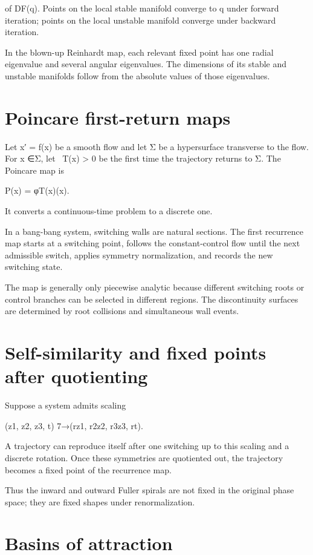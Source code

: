 of DF(q). Points on the local stable manifold converge to q under forward iteration; points on the local unstable manifold converge under backward iteration.


In the blown-up Reinhardt map, each relevant fixed point has one radial eigenvalue and several angular eigenvalues. The dimensions of its stable and unstable manifolds follow from the absolute values of those eigenvalues.


\section{Poincare first-return maps}

\begin{displaytext}
Let x′ = f(x) be a smooth flow and let Σ be a hypersurface transverse to the flow. For x ∈Σ, let \
T(x) > 0 be the first time the trajectory returns to Σ. The Poincare map is
\end{displaytext}

P(x) = φT(x)(x).


It converts a continuous-time problem to a discrete one.


In a bang-bang system, switching walls are natural sections. The first recurrence map starts at a switching point, follows the constant-control flow until the next admissible switch, applies symmetry normalization, and records the new switching state.


The map is generally only piecewise analytic because different switching roots or control branches can be selected in different regions. The discontinuity surfaces are determined by root collisions and simultaneous wall events.


\section{Self-similarity and fixed points after quotienting}

Suppose a system admits scaling


(z1, z2, z3, t) 7→(rz1, r2z2, r3z3, rt).


A trajectory can reproduce itself after one switching up to this scaling and a discrete rotation. Once these symmetries are quotiented out, the trajectory becomes a fixed point of the recurrence map.


Thus the inward and outward Fuller spirals are not fixed in the original phase space; they are fixed shapes under renormalization.


\section{Basins of attraction}

